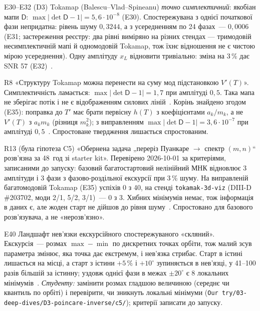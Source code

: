 \begin{established}{E30--E32 (D3)}
Tokamap (Balescu--Vlad--Spineanu) \emph{точно симплектичний}: якобіан мапи $\mathsf D$: $\max|\det\mathsf D-1|=5{,}6\cdot10^{-8}$ (E30). Спостережувана з однієї початкової фази непридатна: рівень шуму $0{,}3244$, а з усередненням по 24 фазах~--- $0{,}0006$ (E31; застереження реєстру: два рівні виміряно на різних стендах --- тримодовій несимплектичній мапі й одномодовій Tokamap, тож їхнє відношення не є чистою мірою усереднення). Одну амплітуду $x_L$ відновити тривіально: зміна на 3\,\% дає SNR 57 (E32)~\cite{ProjRegisters,ProjDeepDives}.
\end{established}
\begin{refuted}{R8}
«Структуру Tokamap можна перенести на суму мод підстановкою $V'(T)$». Симплектичність ламається: $\max|\det\mathsf D-1|=1{,}7$ при амплітуді $0{,}5$. Така мапа не зберігає потік і не є відображенням силових ліній~\cite{ProjRegisters,ProjDeepDives}.
Корінь знайдено згодом (E35): поправка до $T'$ має брати первісну $h(T)$ з коефіцієнтами $a_k/m_k$, а не $V'(T)$ з $a_k m_k$ (різниця $m_k^2$); з виправленням $\max|\det\mathsf D-1|=3{,}6\cdot10^{-7}$ при амплітуді $0{,}5$~\cite{ProjRegisters}. Спростоване твердження лишається спростованим.
\end{refuted}
\begin{refuted}{R13 (була гіпотеза C5)}
«Обернена задача „переріз Пуанкаре $\to$ спектр $(m,n)$“ розв'язна за 48~год зі starter kit». Перевірено 2026-10-01 за критеріями, записаними до запуску: базовий багатостартовий нелінійний МНК відновлює 3 амплітуди і 3 фази з фазово-роздільної екскурсії при 3\,\% шуму. На виправленій багатомодовій Tokamap (E35) успіхів 0 з 40, на стенді \texttt{tokamak-3d-viz} (DIII-D \#203702, моди 2/1, 5/2, 3/1)~--- 0 з 3. Хибних мінімумів немає, тож інформація в даних є, але жоден старт не дійшов до рівня шуму~\cite{ProjRegisters,ProjDeepDives}. Спростовано для базового розв'язувача, а не «нерозв'язно».
\end{refuted}
\begin{established}{E40}
Ландшафт нев'язки екскурсійного спостережуваного «скляний». Екскурсія~--- розмах $\max-\min$ по дискретних точках орбіти, тож малий зсув параметра змінює, яка точка дає екстремум, і нев'язка стрибає. Старт в істині лишається на місці, а старт з істини $+5\,\%$ і $+10^\circ$ зупиняється в нев'язці, у 41--100 разів більшій за істинну; уздовж однієї фази в межах $\pm20^\circ$ є 8 локальних мінімумів~\cite{ProjRegisters,ProjGuide}. \emph{Студенту:} замінити розмах гладшою величиною (середнє чи квантиль по орбіті) і перевірити, чи зникнуть локальні мінімуми (\texttt{Our try/03-deep-dives/D3-poincare-inverse/c5/}); критерії записати до запуску.
\end{established}

